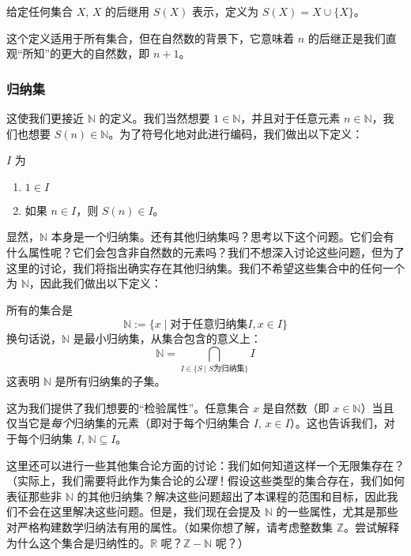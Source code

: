 \begin{definition}
    给定任何集合 $X$, $X$ 的后继用 $S(X)$ 表示，定义为 $S(X) = X \cup \{X\}$。
\end{definition}

这个定义适用于所有集合，但在自然数的背景下，它意味着 $n$ 的后继正是我们直观``所知''的更大的自然数，即 $n + 1$。

\subsubsection*{归纳集}

这使我们更接近 $\mathbb{N}$ 的定义。我们当然想要 $1 \in \mathbb{N}$，并且对于任意元素 $n \in \mathbb{N}$，我们也想要 $S(n) \in \mathbb{N}$。为了符号化地对此进行编码，我们做出以下定义：

\begin{definition}
    $I$ 为
    \begin{enumerate}
        \item $1 \in I$
        \item 如果 $n \in I$，则 $S(n) \in I$。
    \end{enumerate}
\end{definition}

显然，$\mathbb{N}$ 本身是一个归纳集。还有其他归纳集吗？思考以下这个问题。它们会有什么属性呢？它们会包含非自然数的元素吗？我们不想深入讨论这些问题，但为了这里的讨论，我们将指出确实存在其他归纳集。我们不希望这些集合中的任何一个为 $\mathbb{N}$，因此我们做出以下定义：

\begin{definition}
    所有的集合是
    \[\mathbb{N} := \{x \mid \text{对于任意归纳集} I, x \in I\}\]
    换句话说，$\mathbb{N}$ 是最小归纳集，从集合包含的意义上：
    \[\mathbb{N} = \bigcap_{I \in \{S \mid S \text{为归纳集}\}} I\]
    这表明 $\mathbb{N}$ 是所有归纳集的子集。
\end{definition}

这为我们提供了我们想要的``检验属性''。任意集合 $x$ 是自然数（即 $x \in \mathbb{N}$）当且仅当它是\emph{每个}归纳集的元素（即对于每个归纳集合 $I$, $x \in I$）。这也告诉我们，对于每个归纳集 $I$, $\mathbb{N} \subseteq I$。

这里还可以进行一些其他集合论方面的讨论：我们如何知道这样一个无限集存在？（实际上，我们需要将此作为集合论的\emph{公理}！假设这些类型的集合存在，我们如何表征那些非 $\mathbb{N}$ 的其他归纳集？解决这些问题超出了本课程的范围和目标，因此我们不会在这里解决这些问题。但是，我们现在会提及 $\mathbb{N}$ 的一些属性，尤其是那些对严格构建数学归纳法有用的属性。（如果你想了解，请考虑整数集 $\mathbb{Z}$。尝试解释为什么这个集合是归纳性的。$\mathbb{R}$ 呢？$\mathbb{Z} - \mathbb{N}$ 呢？）


